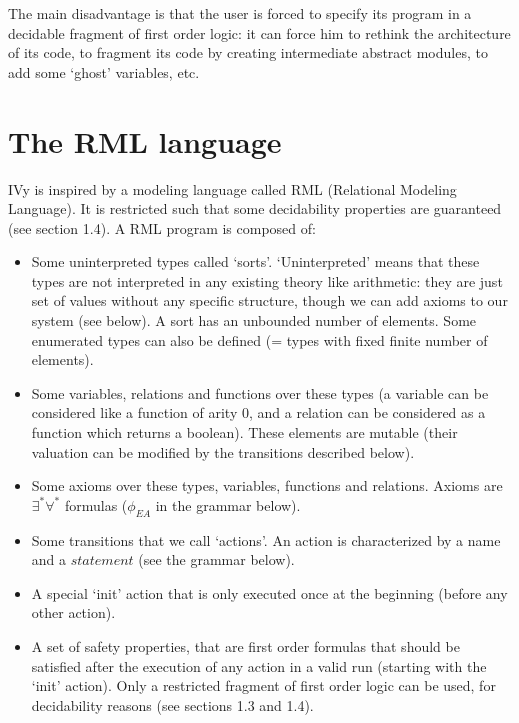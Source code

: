 \documentclass[11pt,a4paper,oldfontcommands,openany]{memoir}
\begin{document}
    The main disadvantage is that the user is forced to specify its program in a decidable fragment of first order logic:
    it can force him to rethink the architecture of its code, to fragment its code by creating intermediate abstract modules,
    to add some `ghost' variables, etc.

    \section{The RML language}

    IVy is inspired by a modeling language called RML (Relational Modeling Language)\cite{Padon:2016:ISV:2908080.2908118}. It is restricted such that some decidability properties are guaranteed (see section 1.4).
    A RML program is composed of:
    \begin{itemize}
        \item Some uninterpreted types called `sorts'. `Uninterpreted' means that these types are not interpreted in any existing theory like arithmetic:
        they are just set of values without any specific structure, though we can add axioms to our system (see below).
        A sort has an unbounded number of elements.
        Some enumerated types can also be defined (= types with fixed finite number of elements).
        \item Some variables, relations and functions over these types (a variable can be considered like a function of arity 0, and a relation can be considered as a function
        which returns a boolean). These elements are mutable (their valuation can be modified by the transitions described below).
        \item Some axioms over these types, variables, functions and relations. Axioms are \(\exists^*\forall^*\) formulas (\( \phi_{EA} \) in the grammar below).
        \item Some transitions that we call `actions'. An action is characterized by a name and a \(statement\) (see the grammar below).
        \item A special `init' action that is only executed once at the beginning (before any other action).
        \item A set of safety properties, that are first order formulas that should be satisfied after the execution of any action in a valid run (starting with the `init' action).
        Only a restricted fragment of first order logic can be used, for decidability reasons (see sections 1.3 and 1.4).
    \end{itemize}
\end{document}
